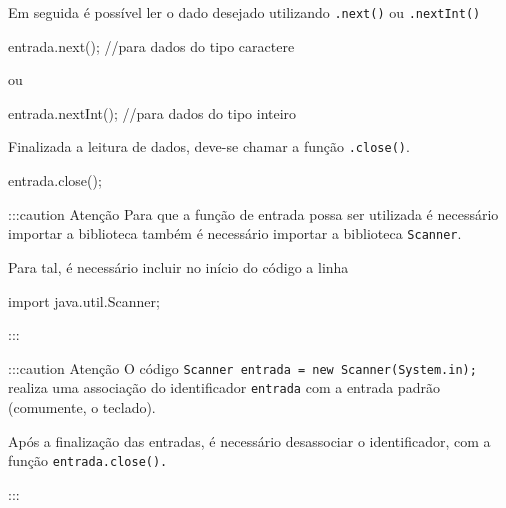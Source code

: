 \documentclass[
  letterpaper,
  DIV=11,
  numbers=noendperiod]{scrreprt}
\newenvironment{Shaded}{\begin{snugshade}}{\end{snugshade}}
\newcommand{\AttributeTok}[1]{\textcolor[rgb]{0.40,0.45,0.13}{#1}}
\newcommand{\CommentTok}[1]{\textcolor[rgb]{0.37,0.37,0.37}{#1}}
\newcommand{\FunctionTok}[1]{\textcolor[rgb]{0.28,0.35,0.67}{#1}}
\newcommand{\ImportTok}[1]{\textcolor[rgb]{0.00,0.46,0.62}{#1}}
\newcommand{\NormalTok}[1]{\textcolor[rgb]{0.00,0.23,0.31}{#1}}
\newcommand{\OperatorTok}[1]{\textcolor[rgb]{0.37,0.37,0.37}{#1}}
\begin{document}
Em seguida é possível ler o dado desejado utilizando \texttt{.next()} ou
\texttt{.nextInt()}

\begin{Shaded}
\begin{Highlighting}[]
\NormalTok{entrada}\OperatorTok{.}\FunctionTok{next}\NormalTok{()}\OperatorTok{;} \CommentTok{//para dados do tipo caractere}
\end{Highlighting}
\end{Shaded}

ou

\begin{Shaded}
\begin{Highlighting}[]
\NormalTok{entrada}\OperatorTok{.}\FunctionTok{nextInt}\NormalTok{()}\OperatorTok{;} \CommentTok{//para dados do tipo inteiro}
\end{Highlighting}
\end{Shaded}

Finalizada a leitura de dados, deve-se chamar a função
\texttt{.close()}.

\begin{Shaded}
\begin{Highlighting}[]
\NormalTok{entrada}\OperatorTok{.}\FunctionTok{close}\NormalTok{()}\OperatorTok{;}
\end{Highlighting}
\end{Shaded}

:::caution Atenção Para que a função de entrada possa ser utilizada é
necessário importar a biblioteca também é necessário importar a
biblioteca \texttt{Scanner}.

Para tal, é necessário incluir no início do código a linha

\begin{Shaded}
\begin{Highlighting}[]
\ImportTok{import}\NormalTok{ java}\OperatorTok{.}\AttributeTok{util}\OperatorTok{.}\AttributeTok{Scanner}\OperatorTok{;}
\end{Highlighting}
\end{Shaded}

:::

:::caution Atenção O código
\texttt{Scanner\ entrada\ =\ new\ Scanner(System.in);} realiza uma
associação do identificador \texttt{entrada} com a entrada padrão
(comumente, o teclado).

Após a finalização das entradas, é necessário desassociar o
identificador, com a função \texttt{entrada.close().}

:::
\end{document}
